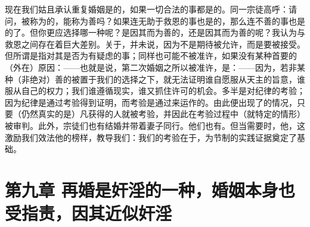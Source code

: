 现在我们姑且承认重复婚姻是的，如果一切合法的事都是的。同一宗徒高呼：请问，被称为的，能称为善吗？如果连无助于救恩的事也是的，那么连不善的事也是的了。但你更应选择哪一种呢？是因其而为善的，还是因其而为善的呢？我认为与救恩之间存在着巨大差别。关于，并未说，因为不是期待被允许，而是要被接受。但所谓是指对其是否为有疑虑的事；同样也可能不被准许，如果没有某种首要的（外在）原因：——也就是说，第二次婚姻之所以被准许，是：——因为，若非某种（非绝对）善的被置于我们的选择之下，就无法证明谁自愿服从天主的旨意，谁服从自己的权力；我们谁遵循现实，谁又抓住许可的机会。多半是对纪律的考验；因为纪律是通过考验得到证明，而考验是通过来运作的。由此便出现了的情况，只要（仍然真实的是）凡获得的人就被考验，并因此在考验过程中（就特定的情形）被审判。此外，宗徒们也有结婚并带着妻子同行。他们也有。但当需要时，他，这激励我们效法他的榜样，教导我们：我们的考验在于，为节制的实践证据奠定了基础。\par


\section{第九章 再婚是奸淫的一种，婚姻本身也受指责，因其近似奸淫}

